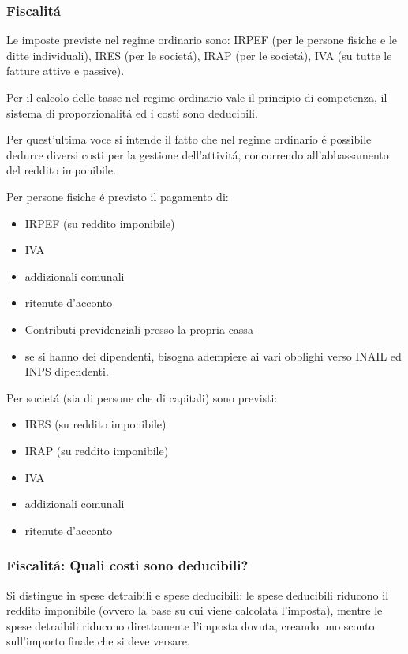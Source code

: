 \documentclass{article}
\begin{document}
\subsubsection{Fiscalit\'a}
Le imposte previste nel regime ordinario sono: IRPEF (per le persone fisiche e le ditte individuali), 
IRES (per le societ\'a), IRAP (per le societ\'a), IVA (su tutte le fatture attive e passive).

Per il calcolo delle tasse nel regime ordinario vale il principio di competenza, il sistema di proporzionalit\'a ed i costi sono deducibili.

Per quest'ultima voce si intende il fatto che nel regime ordinario \'e possibile dedurre diversi costi per la gestione dell'attivit\'a, concorrendo all'abbassamento del reddito imponibile.

Per persone fisiche \'e previsto il pagamento di:
\begin{itemize}
    \item IRPEF (su reddito imponibile)
    \item IVA
    \item addizionali comunali
    \item ritenute d'acconto
    \item Contributi previdenziali presso la propria cassa
    \item se si hanno dei dipendenti, bisogna adempiere ai vari obblighi verso INAIL ed INPS dipendenti.
\end{itemize}

Per societ\'a (sia di persone che di capitali) sono previsti:
\begin{itemize}
    \item IRES (su reddito imponibile)
    \item IRAP (su reddito imponibile)
    \item IVA
    \item addizionali comunali
    \item ritenute d'acconto
\end{itemize}

\subsubsection{Fiscalit\'a: Quali costi sono deducibili?}
Si distingue in spese detraibili e spese deducibili: 
le spese deducibili riducono il reddito imponibile (ovvero la base su cui viene calcolata l'imposta),
mentre le spese detraibili riducono direttamente l'imposta dovuta, creando uno sconto sull'importo finale che si deve versare.
\end{document}

